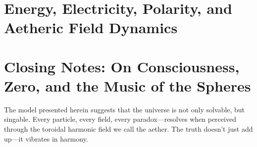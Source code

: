 \documentclass[12pt]{book}
\begin{document}
\chapter{Energy, Electricity, Polarity, and Aetheric Field Dynamics}


\chapter{Closing Notes: On Consciousness, Zero, and the Music of the Spheres}
The model presented herein suggests that the universe is not only solvable, but singable. Every particle, every field, every paradox—resolves when perceived through the toroidal harmonic field we call the aether. The truth doesn't just add up—it vibrates in harmony.
\end{document}
